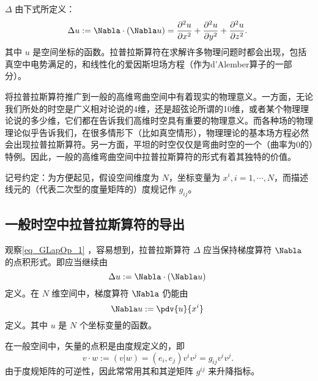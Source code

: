 
 $\Delta$ 由下式所定义：
\begin{equation}\label{eq_GLapOp_1}
\Delta u:=\Nabla\cdot (\Nabla u)=\frac{\partial^{2}{u}}{\partial{x}^{2}} + \frac{\partial^{2}{u}}{\partial{y}^{2}} + \frac{\partial^{2}{u}}{\partial{z}^{2}}.~
\end{equation}
其中 $u$ 是空间坐标的函数。拉普拉斯算符在求解许多物理问题时都会出现，包括真空中电势满足的，和线性化的爱因斯坦场方程（作为d'Alember算子的一部分）。

将拉普拉斯算符推广到一般的高维弯曲空间中有着现实的物理意义。一方面，无论我们所处的时空是广义相对论说的4维，还是超弦论所谓的10维，或者某个物理理论说的多少维，它们都在告诉我们高维时空具有重要的物理意义。而各种场的物理理论似乎告诉我们，在很多情形下（比如真空情形），物理理论的基本场方程必然会出现拉普拉斯算符。另一方面，平坦的时空仅仅是弯曲时空的一个（曲率为0的）特例。因此，一般的高维弯曲空间中拉普拉斯算符的形式有着其独特的价值。

记号约定：为方便起见，假设空间维度为 $N$，坐标变量为 $x^i,i=1,\cdots,N$，而描述线元的（代表二次型的度量矩阵的）度规记作 $g_{ij}$。

\subsection{一般时空中拉普拉斯算符的导出}
观察\autoref{eq_GLapOp_1} ，容易想到，拉普拉斯算符 $\Delta$ 应当保持梯度算符 $\Nabla$ 的点积形式。即应当继续由
\begin{equation}
\Delta u:=\Nabla\cdot (\Nabla u)~
\end{equation}
定义。在 $N$ 维空间中，梯度算符 $\Nabla$ 仍能由 
\begin{equation}
\Nabla u:=\pdv{u}{x^i}~
\end{equation}
定义。其中 $u$ 是 $N$ 个坐标变量的函数。

在一般空间中，矢量的点积是由度规定义的，即
\begin{equation}
v\cdot w:=(v|w)=(e_i,e_j)v^iv^j=g_{ij}v^iv^j.~
\end{equation}
由于度规矩阵的可逆性，因此常常用其和其逆矩阵 $g^{ij}$ 来升降指标。







